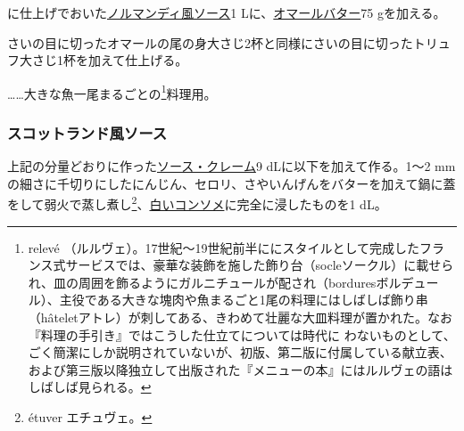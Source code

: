 \begin{recette}

に仕上げでおいた\protect\hyperlink{sauce-normande}{ノルマンディ風ソース}1
Lに、\protect\hyperlink{beurre-de-homard}{オマールバター}75 gを加える。

さいの目に切ったオマールの尾の身大さじ2杯と同様にさいの目に切ったトリュフ大さじ1杯を加えて仕上げる。

\ldots{}\ldots{}大きな魚一尾まるごとの\footnote{relevé
  （ルルヴェ）。17世紀〜19世紀前半ににスタイルとして完成したフランス式サービスでは、豪華な装飾を施した飾り台（socleソークル）に載せられ、皿の周囲を飾るようにガルニチュールが配され（borduresボルデュール）、主役である大きな塊肉や魚まるごと1尾の料理にはしばしば飾り串（hâteletアトレ）が刺してある、きわめて壮麗な大皿料理が置かれた。なお『料理の手引き』ではこうした仕立てについては時代に
  わないものとして、ごく簡潔にしか説明されていないが、初版、第二版に付属している献立表、および第三版以降独立して出版された『メニューの本』にはルルヴェの語はしばしば見られる。}料理用。

\hypertarget{sauce-ecossaise}{%
\subsubsection{スコットランド風ソース}\label{sauce-ecossaise}}



上記の分量どおりに作った\protect\hyperlink{sauce-creme}{ソース・クレーム}9
dLに以下を加えて作る。1〜2
mmの細さに千切りにしたにんじん、セロリ、さやいんげんをバターを加えて鍋に蓋をして弱火で蒸し煮し\footnote{étuver
  エチュヴェ。}、\protect\hyperlink{}{白いコンソメ}に完全に浸したものを1
dL。


\end{recette}
